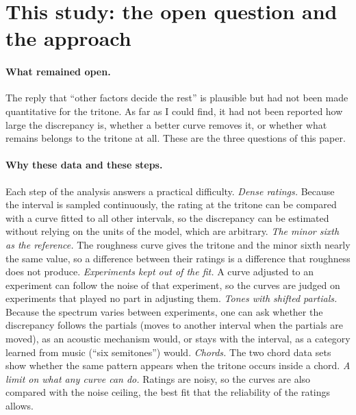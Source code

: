 \documentclass[11pt,a4paper]{article}
\begin{document}
\section{This study: the open question and the approach}
\label{sec:approach}

\paragraph{What remained open.}
The reply that ``other factors decide the rest'' is plausible but had not been made
quantitative for the tritone. As far as I could find, it had not been reported how large the discrepancy is, whether a
better curve removes it, or whether what remains belongs to the tritone at all. These are the three
questions of this paper.

\paragraph{Why these data and these steps.}
Each step of the analysis answers a practical difficulty. \emph{Dense ratings.} Because the
interval is sampled continuously, the rating at the tritone can be compared with a curve
fitted to all other intervals, so the discrepancy can be estimated without relying on the
units of the model, which are arbitrary. \emph{The minor sixth as the reference.} The
roughness curve gives the tritone and the minor sixth nearly the same value, so a difference
between their ratings is a difference that roughness does not produce. \emph{Experiments kept
out of the fit.} A curve adjusted to an experiment can follow the noise of that experiment, so
the curves are judged on experiments that played no part in adjusting them. \emph{Tones with
shifted partials.} Because the spectrum varies between experiments, one can ask whether the
discrepancy follows the partials (moves to another interval when the partials are moved), as
an acoustic mechanism would, or stays with the interval, as a category learned from music
(``six semitones'') would. \emph{Chords.} The two chord data sets show whether the same
pattern appears when the tritone occurs inside a chord. \emph{A limit on what any curve can
do.} Ratings are noisy, so the curves are also compared with the noise ceiling, the best fit
that the reliability of the ratings allows.
\end{document}
